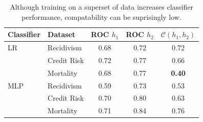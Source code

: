 \documentclass[letterpaper]{article}
\newcommand{\hone}{\mbox{$h_1$}}
\newcommand{\htwo}{\mbox{$h_2$}}
\newcommand{\compatscore}{\mathcal{C}}
\begin{document}
\begin{table}[t]
\footnotesize
\centering
\begin{tabular}{|l|l|c|c|c|}
\hline
Classifier & Dataset                         & ROC $\hone$ & ROC $\htwo$ & $\compatscore(\hone, \htwo)$ \\
\hline
LR & Recidivism       &   0.68 &        0.72     &   0.72               \\
& Credit Risk          &   0.72     &    0.77    &   0.66              \\
& Mortality    &    0.68 &    0.77    &    {\bf 0.40}                    \\
\hline
MLP & Recidivism   &   0.59     &     0.73   &     0.53                    \\
& Credit Risk     &  0.70   &    0.80    &     0.63                     \\
& Mortality &       0.71 &     0.84   &     0.76            \\
\hline
\end{tabular}
\caption{\label{tab:score} Although training on a superset of data increases classifier performance, compatability can be suprisingly low.}
\end{table}
\end{document}
